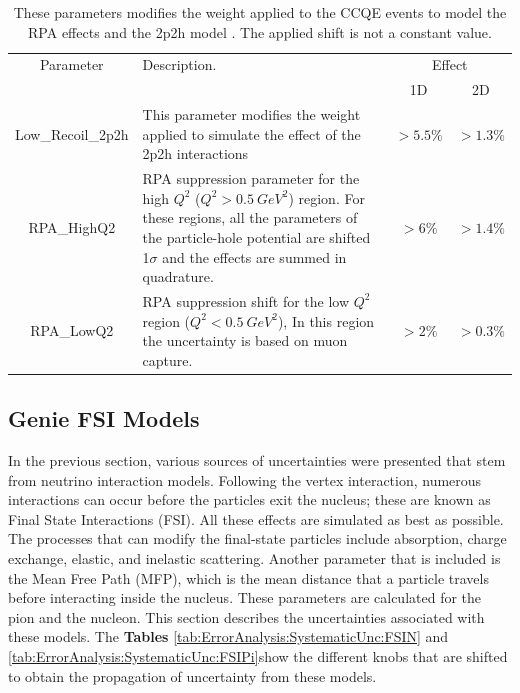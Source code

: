\begin{table}[!htb]
    \centering
    \begin{tabular}{c|p{2in}|c|c}
        \hline 
        Parameter & Description.  & \multicolumn{2}{c}{Effect} \\
         & & 1D & 2D \\
        \hline  
        Low\_Recoil\_2p2h & This parameter modifies the weight applied to simulate the effect of the 2p2h interactions & $>5.5\%$ & $>1.3\%$ \\ \hline
        RPA\_HighQ2 & RPA suppression parameter for the high $Q^2$ ($Q^2 > 0.5\ GeV^2$) region. For these regions, all the parameters of the particle-hole potential are shifted 1$\sigma$ and the effects are summed in quadrature. & $>6\%$ & $>1.4\%$ \\ \hline
        RPA\_LowQ2 & RPA suppression shift for the low $Q^2$ region ($Q^2 < 0.5\ GeV^2$), In this region the uncertainty is based on muon capture. & $>2\%$ & $>0.3\%$ \\ \hline 
    \end{tabular}
    \caption{These parameters modifies the weight applied to the CCQE events to model the RPA effects \cite{RPAgran2017model} and the 2p2h model \cite{2p2hRodrigues_2016}. The applied shift is not a constant value.}
    \label{tab:ErrorAnalysis:SystematicUnc:MnvTune}
\end{table}



\pagebreak
\subsection{Genie FSI Models}
\label{Cap:ErrorAnalysis:SystematicUnc:GenieFSINucleons}
In the previous section, various sources of uncertainties were presented that stem from neutrino interaction models. Following the vertex interaction, numerous interactions can occur before the particles exit the nucleus; these are known as Final State Interactions (FSI). All these effects are simulated as best as possible. The processes that can modify the final-state particles include absorption, charge exchange, elastic, and inelastic scattering. Another parameter that is included is the Mean Free Path (MFP), which is the mean distance that a particle travels before interacting inside the nucleus. These parameters are calculated for the pion and the nucleon. This section describes the uncertainties associated with these models. The \textbf{Tables} \ref{tab:ErrorAnalysis:SystematicUnc:FSIN} and \ref{tab:ErrorAnalysis:SystematicUnc:FSIPi}show the different knobs that are shifted to obtain the propagation of uncertainty from these models. 

